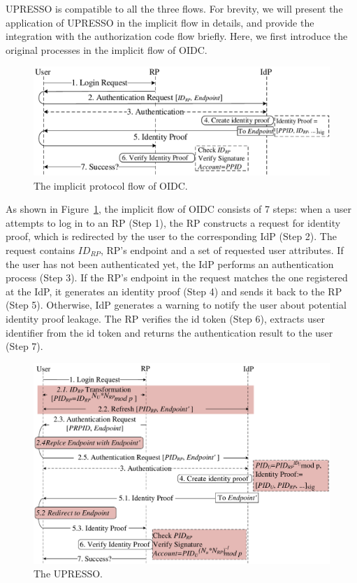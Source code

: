 UPRESSO is compatible to all the three flows.
For brevity, we will present the application of UPRESSO in the implicit flow in details, and provide the integration with the authorization code flow briefly.
Here, we first introduce the original processes in the implicit flow of OIDC.
\begin{figure}[t]
  \centering
  \includegraphics[width=\linewidth]{fig/OIDC1.pdf}
  \caption{The implicit protocol flow of OIDC.}
  \label{fig:OpenID}
\end{figure}
As shown in Figure~\ref{fig:OpenID}, the implicit flow of OIDC consists of 7 steps: when a user attempts to log in to an RP (Step 1), the RP constructs a request for identity proof, which is redirected by the user to the corresponding IdP (Step 2). The request contains $ID_{RP}$, RP's endpoint and a set of requested user attributes. If the user has not been authenticated yet, the IdP performs an authentication process (Step 3). If the RP's endpoint in the request matches the one registered at the IdP, it generates an identity proof (Step 4) and sends it back to the RP (Step 5). Otherwise, IdP generates a warning to notify the user about potential identity proof leakage. The RP verifies the id token (Step 6), extracts user identifier from the id token and returns the authentication result to the user (Step 7).



\begin{figure}[t]
  \centering
  \includegraphics[width=\linewidth]{fig/overview1.pdf}
  \caption{The UPRESSO.}
  \label{fig:UPRESSO}
\end{figure}

